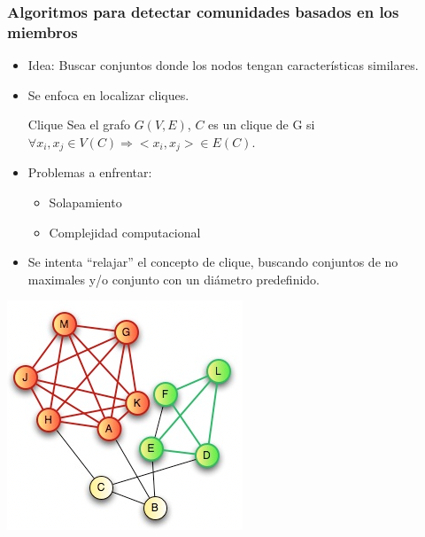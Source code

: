 \documentclass[
10pt, %
aspectratio=169, %
]{beamer}
\begin{document}
	\begin{frame}
		
		\frametitle{Algoritmos para detectar comunidades basados en los miembros}
		
		\begin{minipage}{0.55\textwidth}
			
			\begin{itemize}
				\item Idea: Buscar conjuntos donde los nodos tengan características similares. \\[0.5mm]
				
				\item Se enfoca en localizar cliques.
			
				\begin{alertblock}{Clique}
					Sea el grafo $G(V, E)$, $C$ es un clique de G si $\forall x_i, x_j \in V(C) \Rightarrow <x_i, x_j> \in E(C)$. 
				\end{alertblock} 
				
				\vspace{0.5\baselineskip}
				
				\item Problemas a enfrentar:
				\begin{itemize}
					\item Solapamiento
					\item Complejidad computacional \\[0.5mm]
				\end{itemize}
				
				\item Se intenta ``relajar'' el concepto de clique, buscando conjuntos de no maximales y/o conjunto con un diámetro predefinido.
				
			\end{itemize}
			
		\end{minipage}%
		\hfill
		\begin{minipage}{0.35\textwidth}
			
			\centering
			\includegraphics[scale=0.6]{clique.png}
			
		\end{minipage}%
		
	\end{frame}
	
\end{document}
